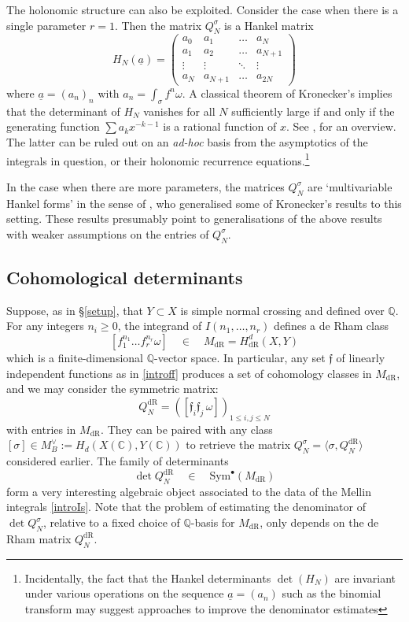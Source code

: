 \documentclass[a4paper,10pt]{amsart}
\theoremstyle{definition}
\theoremstyle{remark}
\numberwithin{equation}{section}
\newcommand{\Q}{\mathbb Q}
\newcommand{\C}{\mathbb C}
\newcommand{\dR}{\mathrm{dR}}
\newcommand{\ff}{\mathfrak{f}}
\newcommand{\0}{\color{blue}{\mathsf{0}}}
\begin{document}
 
 
 
 The holonomic structure can also be exploited. 
Consider  the case when there is a single parameter $r=1$. Then the matrix $Q_N^{\sigma}$ is a Hankel matrix 
\[ H_N(\underline{a})= \begin{pmatrix}  a_0 & a_1 & \ldots &a_N  \\ 
  a_1 & a_2 & \ldots &a_{N+1} \\
\vdots & \vdots &  \ddots & \vdots \\
a_N & a_{N+1} &  \ldots & a_{2N}
\end{pmatrix} \]
where $\underline{a}= (a_n)_n$ with $a_n = \int_{\sigma} f^n \omega$. A classical theorem of Kronecker's implies that the determinant of $H_N$  vanishes for all $N$ sufficiently large  if and only if 
the generating function $\sum a_k x^{-k-1}$ is a rational function of $x$.  See \cite[\S2]{HankelSolvability2016}, for an overview. 
 The latter can be ruled out on an \emph{ad-hoc} basis from the asymptotics of the integrals in question, or their holonomic recurrence equations.\footnote{Incidentally, the fact that the Hankel determinants $\det(H_N)$ are invariant under various operations on the sequence $\underline{a}=(a_n)$ such as the binomial transform may suggest  approaches to improve the denominator estimates}


In the case when there are more parameters, the matrices $Q_N^{\sigma}$ are `multivariable Hankel forms' in the sense of  \cite{PowerHankel}, who generalised some of Kronecker's results to this setting.  These results presumably point to generalisations of the above  results with weaker assumptions on the entries of  $Q_N^{\sigma}$. 
 
 
 \subsection{Cohomological determinants} 
 Suppose, as in \S\ref{setup},   that $Y\subset X$ is simple normal crossing and defined over $\Q$.   For any  integers $n_i\geq0$,  the  integrand of $I(n_1,\ldots, n_r)$ defines a de Rham class
\[   [  f_1^{n_1} \ldots f_r^{n_r} \omega ] \quad  \in \quad  M_{\dR}  = H_{\dR}^d(X, Y) \]
which is a finite-dimensional $\Q$-vector space. In particular, any set $\ff$ of linearly independent functions as in \eqref{introff} produces a set of cohomology classes in $M_{\dR}$, and we may  
 consider the symmetric matrix:
  \begin{equation}  Q^{\dR}_N =   \left(  [  \ff_i  \ff_j \,   \omega]  \right)_{1\leq i,j\leq N} \end{equation}
 with entries  in $M_{\dR}$. They can be paired with any class $[\sigma] \in M_B^{\vee}:= H_d(X(\C),Y(\C)) $  to retrieve the matrix 
$  Q^{\sigma}_N=     \langle \sigma , Q^{\dR}_N \rangle $   considered  earlier. The family of determinants 
  \[  \det Q^{\dR}_N  \quad \in \quad  \mathrm{Sym}^{\bullet} ( M_{\dR}) \]
  form a very interesting algebraic object associated to the data of the Mellin integrals \eqref{introIs}. Note that the problem of  estimating  the denominator of $\det Q^{\sigma}_N$, relative to a fixed choice of $\Q$-basis for $M_{\dR}$, only depends    on     the de Rham matrix $Q^{\dR}_N$. 
  
\end{document}
